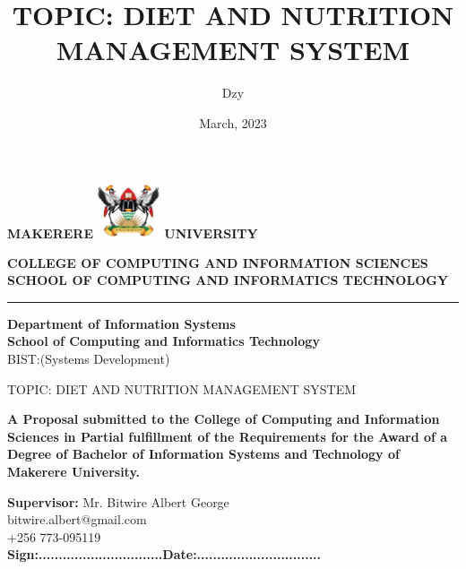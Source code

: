 \documentclass{article}
\begin{document}
\title{\textbf{TOPIC:  DIET AND NUTRITION MANAGEMENT SYSTEM} }
\author{Dzy}
\date{March, 2023}
\begin{center}

\textbf{\Huge{MAKERERE}} \includegraphics[width=70px]{images/muk_logo.png} \textbf{\Huge{UNIVERSITY}}


\begin{center}
\large{\textbf{COLLEGE OF COMPUTING AND INFORMATION SCIENCES\\ SCHOOL OF COMPUTING AND INFORMATICS TECHNOLOGY}}

\end{center}

\hrule

\vspace{20px} 


\vspace{-9pt} 

\begin{center}
\textbf{Department of Information Systems}\\
\textbf{School of Computing and Informatics Technology}
\\ BIST:(Systems Development)
\end{center}
\vspace{20px} 

{\LARGE TOPIC:  DIET AND NUTRITION MANAGEMENT SYSTEM}\
\vspace{5px} 

\begin{center}
\textbf{A Proposal submitted to the College of Computing and Information Sciences in Partial fulfillment of the Requirements for the Award of a Degree of Bachelor of Information Systems and Technology of Makerere University.}
\end{center}

\vspace{3pt} 
\textbf{Supervisor:} Mr. Bitwire Albert George \\
 bitwire.albert@gmail.com \\ +256 773-095119 \\
\vspace{25pt}
\textbf{
Sign:...............................\hspace{40pt}Date:...............................} \\
\vspace{25pt}


\end{center}
\end{document}
